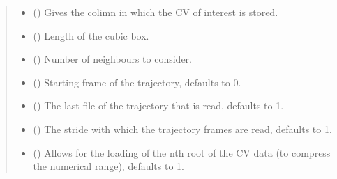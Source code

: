 \documentclass[a4paper,10pt,english]{report}
\begin{document}
\begin{fulllineitems}
\begin{quote}
\begin{description}
\begin{itemize}
\item {} 
\sphinxAtStartPar
{} () \textendash{} Gives the colimn in which the CV of interest is stored.

\item {} 
\sphinxAtStartPar
{} () \textendash{} Length of the cubic box.

\item {} 
\sphinxAtStartPar
{} () \textendash{} Number of neighbours to consider.

\item {} 
\sphinxAtStartPar
{} (\sphinxstyleliteralemphasis{\sphinxupquote{, }}) \textendash{} Starting frame of the trajectory, defaults to 0.

\item {} 
\sphinxAtStartPar
{} (\sphinxstyleliteralemphasis{\sphinxupquote{, }}) \textendash{} The last file of the trajectory that is read, defaults to \sphinxhyphen{}1.

\item {} 
\sphinxAtStartPar
{} (\sphinxstyleliteralemphasis{\sphinxupquote{, }}) \textendash{} The stride with which the trajectory frames are read, defaults to 1.

\item {} 
\sphinxAtStartPar
{} (\sphinxstyleliteralemphasis{\sphinxupquote{, }}) \textendash{} Allows for the loading of the n\sphinxhyphen{}th root of the CV data (to compress the numerical range), defaults to 1.

\end{itemize}

\end{description}\end{quote}

\end{fulllineitems}
\end{document}
